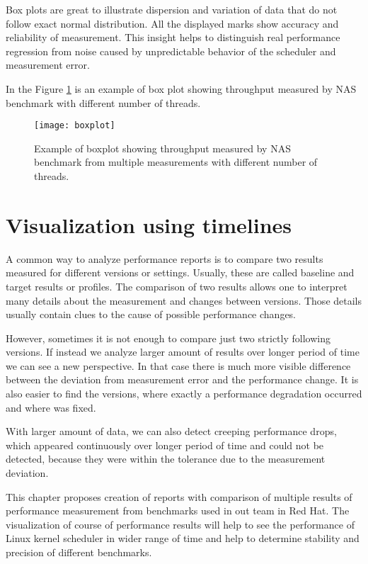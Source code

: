 Box plots are great to illustrate dispersion and variation of data that do not
follow exact normal distribution. All the displayed marks show accuracy and
reliability of measurement. This insight helps to distinguish real performance
regression from noise caused by unpredictable behavior of the scheduler and
measurement error.

In the Figure \ref{fig:boxplot} is an example of box plot showing throughput
measured by NAS benchmark with different number of threads.  

\begin{figure}
  \centering
  \texttt{[image: boxplot]}
  \caption{Example of boxplot showing throughput measured by NAS benchmark from
    multiple measurements with different number of threads.}
  \label{fig:boxplot}
\end{figure}



\chapter{Visualization using timelines} \label{ch:timelines}
A common way to analyze performance reports is to compare two results measured
for different versions or settings. Usually, these
are called baseline and target results or profiles. The comparison of two
results allows one to
interpret many details about the measurement and changes between versions. Those
details usually contain clues to the cause of possible performance changes.

However, sometimes it is not enough to compare just two strictly following
versions. If instead we analyze larger amount
of results over longer period of time we can see a new perspective. In that case
there is much
more visible difference between the deviation from measurement error and the
performance change. It is also easier to find the versions, where exactly a
performance degradation occurred and where was fixed.

With larger amount of data, we can also detect creeping performance drops, which
appeared continuously over longer period of time and could not be detected,
because they were within the tolerance due to the measurement deviation.

This chapter proposes creation of reports with comparison of multiple results of
performance measurement from benchmarks used in out team in Red Hat. The
visualization of course of performance results will help to see the performance
of Linux kernel scheduler in wider range of time and help to determine stability
and precision of different benchmarks.

